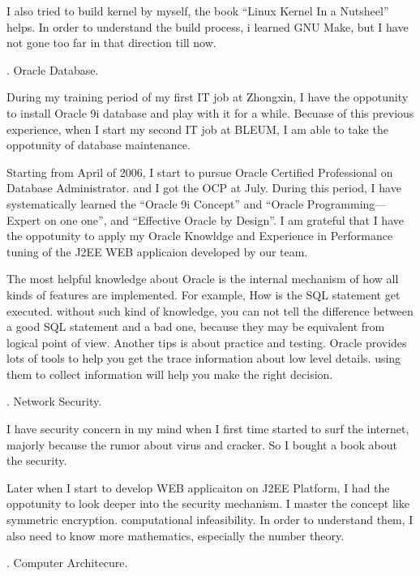 I also tried to build kernel by myself, the book ``Linux Kernel In a Nutsheel''
helps. In order to understand the build process, i learned GNU Make, but I have
 not gone too far in that direction till now.



{}. Oracle Database.

During my training period of my first IT job at Zhongxin, I have the oppotunity 
to install 
Oracle 9i database and play with it for a while. Becuase of this previous 
experience, when I start my second IT job
at BLEUM, I am able to take the oppotunity of database maintenance.

Starting from April of 2006, I start to pursue Oracle Certified Professional on 
Database Administrator. and I got the OCP at July. During this period, I have 
systematically learned the ``Oracle 9i Concept'' and ``Oracle Programming---%
Expert on one one'', and ``Effective Oracle by Design''. I am grateful that I 
have the oppotunity to apply my Oracle Knowldge and Experience in Performance
tuning of the J2EE WEB applicaion developed by our team.

The most helpful knowledge about Oracle is the internal mechanism of how all 
kinds of features are implemented. For example, How is the SQL statement get
executed. without such kind of knowledge, you can not tell the difference
 between a good SQL statement and a bad one, because they may be equivalent 
 from logical point of view.
 Another tips is about practice and testing. Oracle provides lots of tools to 
 help you get the trace information about low level details. using them to 
 collect information will help you make the right decision.
 
  

{}. Network Security.

I have security concern in my mind when I first time started to surf the 
internet, majorly because the rumor about virus and cracker. So I bought a book
about the security.

Later when I start to develop WEB applicaiton on J2EE Platform, I had the 
oppotunity to look deeper into the security mechanism. I master the concept like
symmetric encryption. computational infeasibility. In order to understand them,
I also need to know more mathematics, especially the number theory.

{}. Computer Architecure.%

